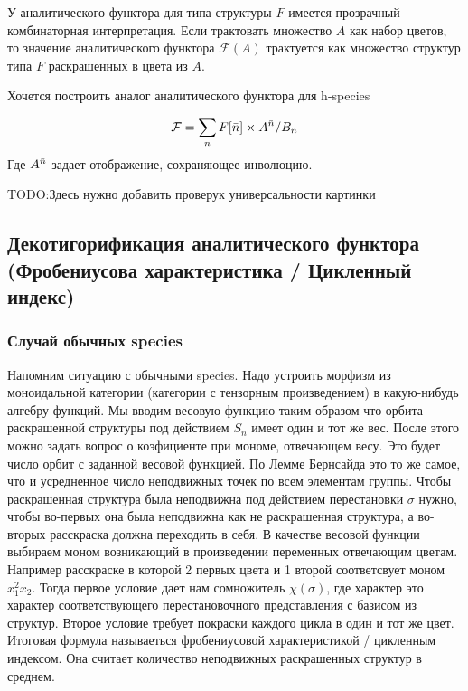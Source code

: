 У аналитического функтора для типа структуры $F$ имеется прозрачный комбинаторная интерпретация.
Если трактовать множество $A$ как набор цветов,
то значение аналитического функтора $\mathcal F(A)$ трактуется как множество структур типа $F$
раскрашенных в цвета из $A$.

Хочется построить аналог аналитического функтора для h-species


\begin{equation}
\label{eq:h-an}
	\mathcal F = \sum\limits_n F[\Bar n] \times A^{\Bar n} / B_n
\end{equation}
Где $A^{\Bar n}$ задает отображение, сохраняющее инволюцию. 

TODO:Здесь нужно добавить проверук универсальности картинки

\subsection{Декотигорификация аналитического функтора (Фробениусова
характеристика / Цикленный индекс)} 
\subsubsection{Случай обычных species}
Напомним ситуацию с обычными species. Надо устроить морфизм из моноидальной
категории (категории с тензорным произведением) в какую-нибудь алгебру функций. Мы вводим весовую
функцию таким образом что орбита раскрашенной структуры под действием $S_n$ имеет один и тот же вес.
После этого можно задать вопрос о коэфициенте при мономе, отвечающем весу. Это
будет число орбит с заданной весовой функцией. По Лемме Бернсайда это то же
самое, что и усредненное число неподвижных точек по всем элементам группы. Чтобы
раскрашенная структура была неподвижна под действием перестановки $\sigma$
нужно, чтобы во-первых она была неподвижна как не раскрашенная структура, а
во-вторых расскраска должна переходить в себя. В качестве
весовой функции выбираем моном возникающий в произведении переменных отвечающим
цветам. Например расскраске в которой 2 первых цвета и 1 второй
соответсвует моном $x_1^2x_2$. Тогда первое условие дает нам сомножитель
$\chi(\sigma)$, где характер это характер соответствующего перестановочного
представления с базисом из структур. Второе условие требует покраски каждого
цикла в один и тот же цвет. Итоговая формула называеться фробениусовой
характеристикой / цикленным индексом. Она считает количество неподвижных
раскрашенных структур в среднем. 

